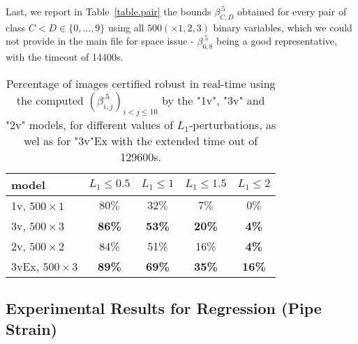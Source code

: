 Last, we report in Table~\ref{table.pair} the bounds $\beta^{.5}_{C,D}$ obtained for every pair of class $C < D \in \{0, \ldots, 9\}$ using all $500 (\times 1,2,3) $ binary variables, which we could not provide in the main file for space issue - $\beta^{.5}_{6,8}$ being a good representative, with the timeout of 14400s.


\begin{table}[t!]
	\begin{tabular}{||l||c|c|c|c||}\hline\hline
		model &    $L_1\leq 0.5$ & $L_1\leq 1$ & $L_1\leq 1.5$ &  $L_1\leq 2$ \\\hline \hline
		1v, $500\times1$ & $80 \%$ & $32\%$ & $7\%$ & $0\%$ \\\hline
		3v, $500 \times 3$ & {\bf 86\%} & {\bf 53\%} & {\bf 20\%} & {\bf 4\%} \\\hline
		2v, $500 \times 2$ & 84\% & 51\% & 16\% & {\bf 4\%} \\\hline \hline
		3vEx, $500 \times 3$ & {\bf 89\%} & {\bf 69\%} & {\bf 35\%} & {\bf 16\%} \\\hline\hline
	\end{tabular}
	\caption{Percentage of images certified robust in real-time 
	using the computed $(\beta^{.5}_{i,j})_{i < j \leq 10}$ 
	by the "1v", "3v" and "2v" models, for different values of $L_1$-perturbations, 
	as wel as for "3v"Ex with the extended time out of 129600s.}
    \label{table.cert}
\end{table}







	
	

\subsection{Experimental Results for Regression (Pipe Strain)}

